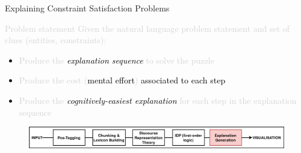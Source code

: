 \documentclass{beamer}
\begin{document}
\begin{frame}{\small{Explaining Constraint Satisfaction Problems}}
    \begin{block}{\textcolor{lightgray}{Problem statement}}
        \textcolor{lightgray}{
            Given the natural language problem statement and set of clues (entities, constraints):}
        \begin{itemize}
            \item \textcolor{lightgray}{Produce the \textcolor{black}{\emph{explanation sequence}} to solve the puzzle}
            \item \textcolor{lightgray}{Produce the cost (\textcolor{black}{mental effort}) \textcolor{black}{associated to each step}}
            \item \textcolor{lightgray}{Produce the \textcolor{black}{\emph{cognitively-easiest explanation}} for each step in the explanation sequence}
        \end{itemize}
    \end{block}

    \begin{figure}[]
        \centering
        \includegraphics[width=\textwidth]{figures/step_8}
    \end{figure}

\end{frame}
\end{document}
